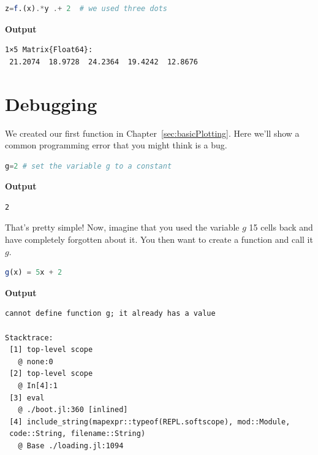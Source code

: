 \begin{lstlisting}[language=Julia,style=mystyle]
z=f.(x).*y .+ 2  # we used three dots
\end{lstlisting}
\textbf{Output} 
\begin{verbatim}
1×5 Matrix{Float64}:
 21.2074  18.9728  24.2364  19.4242  12.8676
\end{verbatim}

\vspace*{.2cm}

\begin{center}
\end{center}



\section{Debugging}

We created our first function in Chapter~\ref{sec:basicPlotting}. Here we'll show a common programming error that you might think is a bug.

\begin{lstlisting}[language=Julia,style=mystyle]
g=2 # set the variable g to a constant
\end{lstlisting}
\textbf{Output} 
\begin{verbatim}
2
\end{verbatim}

That's pretty simple! Now, imagine that you used the variable $g$ 15 cells back and have completely forgotten about it. You then want to create a function and call it $g$. 
\begin{lstlisting}[language=Julia,style=mystyle]
g(x) = 5x + 2
\end{lstlisting}
\textbf{Output} 
\begin{verbatim}
cannot define function g; it already has a value

Stacktrace:
 [1] top-level scope
   @ none:0
 [2] top-level scope
   @ In[4]:1
 [3] eval
   @ ./boot.jl:360 [inlined]
 [4] include_string(mapexpr::typeof(REPL.softscope), mod::Module, 
 code::String, filename::String)
   @ Base ./loading.jl:1094

\end{verbatim}


